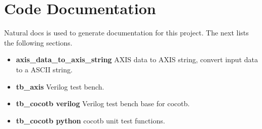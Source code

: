 \section{Code Documentation} \label{Code Documentation}

\par
Natural docs is used to generate documentation for this project. The next lists the following sections.

\begin{itemize}
\item \textbf{axis\_data\_to\_axis\_string} AXIS data to AXIS string, convert input data to a ASCII string.\\
\item \textbf{tb\_axis} Verilog test bench.\\
\item \textbf{tb\_cocotb verilog} Verilog test bench base for cocotb.\\
\item \textbf{tb\_cocotb python} cocotb unit test functions.\\
\end{itemize}

